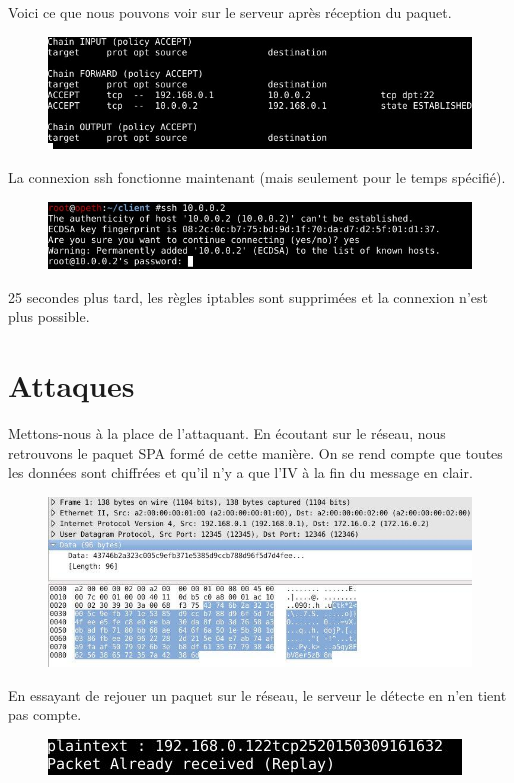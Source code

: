 Voici ce que nous pouvons voir sur le serveur après réception du paquet.
\clearpage

\begin{figure}[h]

\centerline{\includegraphics[scale=0.7]{regles_apres.jpeg}}

\end{figure}

La connexion ssh fonctionne maintenant (mais seulement pour le temps spécifié).

\begin{figure}[h]

\centerline{\includegraphics[scale=0.6]{test_ssh2.jpeg}}

\end{figure}

25 secondes plus tard, les règles iptables sont supprimées et la connexion n'est plus possible.

\clearpage
\section{Attaques}

Mettons-nous à la place de l'attaquant. En écoutant sur le réseau, nous retrouvons le paquet SPA formé de cette manière. On se rend compte que toutes les données sont chiffrées et qu'il n'y a que l'IV à la fin du message en clair.

\begin{figure}[h]

\centerline{\includegraphics[scale=0.6]{wireshark.jpeg}}

\end{figure}

En essayant de rejouer un paquet sur le réseau, le serveur le détecte en n'en tient pas compte.

\begin{figure}[h]

\centerline{\includegraphics[scale=0.8]{rejeu.jpeg}}

\end{figure}
